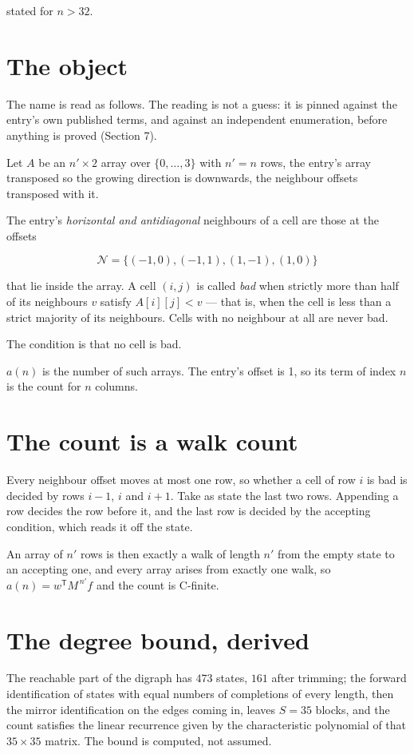 \documentclass[11pt]{article}
\theoremstyle{definition}
\begin{document}
stated for $n > 32$.

\section{The object}

The name is read as follows. The reading is not a guess: it is pinned against the entry's own published terms, and against an independent enumeration, before anything is proved (Section 7).

Let $A$ be an $n' \times 2$ array over $\{0,\dots,3\}$ with $n' = n$ rows, the entry's array transposed so the growing direction is downwards, the neighbour offsets transposed with it.

The entry's {\itshape horizontal and antidiagonal} neighbours of a cell are those at the offsets

\[\mathcal{N} = \{(-1,0), (-1,1), (1,-1), (1,0)\}\]

that lie inside the array. A cell $(i,j)$ is called {\itshape bad} when strictly more than half of its neighbours $v$ satisfy $A[i][j] < v$ --- that is, when the cell is less than a strict majority of its neighbours. Cells with no neighbour at all are never bad.

The condition is that no cell is bad.

$a(n)$ is the number of such arrays. The entry's offset is 1, so its term of index $n$ is the count for $n$ columns.

\section{The count is a walk count}

Every neighbour offset moves at most one row, so whether a cell of row $i$ is bad is decided by rows $i-1$, $i$ and $i+1$. Take as state the last two rows. Appending a row decides the row before it, and the last row is decided by the accepting condition, which reads it off the state.

An array of $n'$ rows is then exactly a walk of length $n'$ from the empty state to an accepting one, and every array arises from exactly one walk, so $a(n) = w^{\mathsf T}M^{\,n'}f$ and the count is C-finite.

\section{The degree bound, derived}

The reachable part of the digraph has $473$ states, $161$ after trimming; the forward identification of states with equal numbers of completions of every length, then the mirror identification on the edges coming in, leaves $S = 35$ blocks, and the count satisfies the linear recurrence given by the characteristic polynomial of that $35\times35$ matrix. The bound is computed, not assumed.
\end{document}
